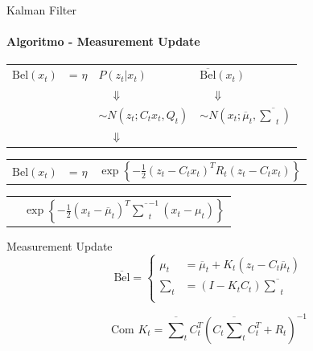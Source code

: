 \documentclass[aspectratio=169]{beamer}
\begin{document}
\begin{frame}[c]{Kalman Filter}
    \framesubtitle{Algoritmo -  Measurement Update}
    \begin{tabular}{p{1.5cm} l l l}
        $\text{Bel}(x_t)$  & = $\eta$ & $P(z_t| x_t)$ & $\overline{\text{Bel}}(x_t)$ \\
        & & $\quad \Downarrow$ & $\quad\Downarrow$ \\
        & & $\sim N\left(z_t; C_t x_t, Q_t\right)$ & $\sim N\left(x_t; \overline{\mu}_t, \overline{\textstyle\sum}_t\right)$ \\
        & & $\quad \Downarrow$ &  \\
    \end{tabular}

   \begin{tabular}{p{1.5cm} l l}
        $\text{Bel}(x_t)$  & = $\eta$ & $\exp\left\{  -\displaystyle\frac{1}{2} \left(z_t - C_t x_t\right)^T R_t \left(z_t - C_t x_t\right)  \right\}$ \\
    \end{tabular}
    
    \begin{tabular}{p{2.5cm} l}
        & $\exp\left\{ -\displaystyle\frac{1}{2} \left(x_t - \overline{\mu}_t\right)^T \overline{\textstyle\sum}_t^{-1} \left(x_t - \mu_t\right) \right\}$
    \end{tabular}  

    \begin{block}{Measurement Update}
        \begin{equation}
            \overline{\text{Bel}} = 
            \left\{
            \begin{aligned}
                    \mu_t & = \overline{\mu}_t + K_t(z_t -C_t \overline{\mu}_t)\\
                    \textstyle\sum_t & = (I-K_tC_t)\overline{\textstyle\sum}_t \\
            \end{aligned} \right.
        \end{equation}

        \begin{equation}
            \text{Com }
            K_t = \overline{\textstyle\sum}_tC_t^T(C_t\overline{\textstyle\sum}_tC_t^T+R_t)^{-1}
        \end{equation}
    \end{block} 
\end{frame}
\end{document}
